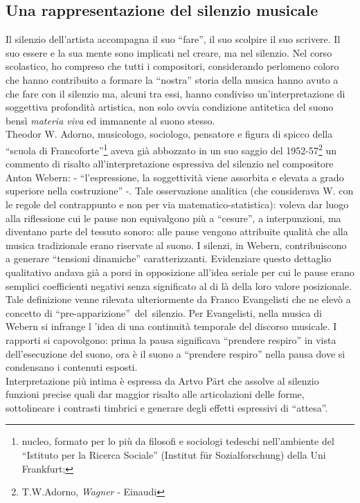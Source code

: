 \documentclass[a4paper,12pt]{article}
\newcommand{\virgo}[1]{``#1''}
\begin{document}
\subsection*{Una rappresentazione del silenzio musicale}
Il silenzio dell'artista accompagna il suo \virgo{fare}, il suo scolpire il suo scrivere. Il suo essere e la sua mente sono implicati nel creare, ma nel silenzio.
Nel corso scolastico, ho compreso che tutti i compositori, considerando perlomeno coloro che hanno contribuito a formare la \virgo{nostra} storia della musica hanno avuto a che fare con il silenzio ma, alcuni tra essi, hanno condiviso un'interpretazione di soggettiva profondità artistica, non solo ovvia condizione antitetica del suono bensì \textit{materia viva} ed immanente al suono stesso.\\
Theodor W. Adorno, musicologo, sociologo, pensatore e figura di spicco della \virgo{scuola di Francoforte}\footnote{nucleo, formato per lo più da filosofi e sociologi tedeschi nell'ambiente del \virgo{Istituto per la Ricerca Sociale} (Institut für Sozialforschung) della Uni Frankfurt;} aveva già abbozzato in un suo saggio del 1952-57\footnote{T.W.Adorno, \emph{Wagner} - Einaudi} un commento di risalto all'interpretazione espressiva del silenzio nel compositore Anton Webern: - \virgo{l'espressione, la soggettività viene assorbita e elevata a grado superiore nella costruzione} -. Tale osservazione analitica (che considerava W. con le regole del contrappunto e non per via matematico-statistica):  voleva dar luogo alla riflessione cui le pause non equivalgono più a \virgo{cesure}, a interpunzioni, ma diventano parte del tessuto sonoro: alle pause vengono attribuite qualità che alla musica tradizionale erano riservate al suono. I silenzi, in Webern, contribuiscono a generare \virgo{tensioni dinamiche} caratterizzanti. Evidenziare questo dettaglio qualitativo andava già a porsi in opposizione all'idea seriale per cui le pause erano semplici coefficienti negativi senza significato al di là della loro valore posizionale\cite{rif2}. Tale definizione venne rilevata ulteriormente da Franco Evangelisti che ne elevò a concetto di \mbox{\virgo{pre-apparizione} del silenzio}. Per Evangelisti, nella musica di Webern si infrange l 'idea di una continuità temporale del discorso musicale. I rapporti si capovolgono: prima la pausa significava \virgo{prendere respiro} in vista dell'esecuzione del suono, ora è il suono a \virgo{prendere respiro} nella pausa dove si condensano i contenuti esposti.\cite{rif3}\\
Interpretazione più intima è espressa da Artvo P\"art che assolve al silenzio funzioni precise quali dar maggior risalto alle articolazioni delle forme, sottolineare i contrasti timbrici e generare degli effetti espressivi di \virgo{attesa}\cite{rif6}.\\
\end{document}
